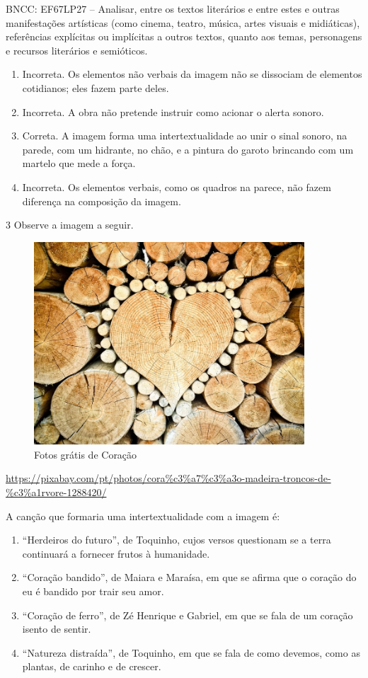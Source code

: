 BNCC: EF67LP27 -- Analisar, entre os textos literários e entre estes e
outras manifestações artísticas (como cinema, teatro, música, artes
visuais e midiáticas), referências explícitas ou implícitas a outros
textos, quanto aos temas, personagens e recursos literários e
semióticos.

\begin{enumerate}
\def\labelenumi{\alph{enumi})}
\item Incorreta. Os elementos não verbais da imagem não se dissociam de
elementos cotidianos; eles fazem parte deles.
\item Incorreta. A obra não pretende instruir como acionar o alerta sonoro.
\item Correta. A imagem forma uma intertextualidade ao unir o sinal sonoro,
na parede, com um hidrante, no chão, e a pintura do garoto brincando com
um martelo que mede a força.
\item Incorreta. Os elementos verbais, como os quadros na parece, não fazem
diferença na composição da imagem.
\end{enumerate}

\num{3} Observe a imagem a seguir.

\begin{figure}
\centering
\includegraphics[width=3.97917in,height=2.98438in]{./imgSAEB_6_POR/media/image14.jpeg}
\caption{Fotos grátis de Coração}
\end{figure}

\url{https://pixabay.com/pt/photos/cora\%c3\%a7\%c3\%a3o-madeira-troncos-de-\%c3\%a1rvore-1288420/}

A canção que formaria uma intertextualidade com a imagem é:

\begin{enumerate}
\def\labelenumi{\alph{enumi})}
\item ``Herdeiros do futuro'', de Toquinho, cujos versos questionam se a
terra continuará a fornecer frutos à humanidade.
\item ``Coração bandido'', de Maiara e Maraísa, em que se afirma que o
coração do eu é bandido por trair seu amor.
\item ``Coração de ferro'', de Zé Henrique e Gabriel, em que se fala de um
coração isento de sentir.
\item ``Natureza distraída'', de Toquinho, em que se fala de como devemos,
como as plantas, de carinho e de crescer.
\end{enumerate}

